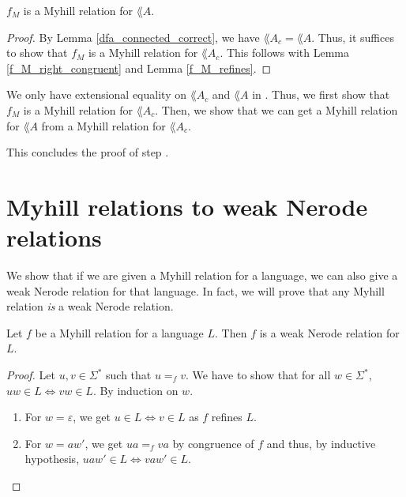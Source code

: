\begin{theorem}
    \label{dfa_to_myhill}
    $f_M$ is a Myhill relation for $\lang{A}$.
\end{theorem}
\begin{proof}
    By Lemma \ref{dfa_connected_correct}, we have $\lang{A_c} = \lang{A}$.
    Thus, it suffices to show that $f_M$ is a Myhill relation for $\lang{A_c}$.
    This follows with Lemma \ref{f_M_right_congruent} and Lemma \ref{f_M_refines}.
\end{proof}


We only have extensional equality on $\lang{A_c}$ and $\lang{A}$ in \coq.
Thus, we first show that $f_M$ is a Myhill relation for $\lang{A_c}$.
Then, we show that we can get a Myhill relation for $\lang{A}$ from a Myhill relation for $\lang{A_c}$.



This concludes the proof of step .

\section{Myhill relations to weak Nerode relations}
We show that if we are given a Myhill relation for a language, we can also give a weak Nerode relation for that language.
In fact, we will prove that any Myhill relation \textit{is} a weak Nerode relation.

\begin{theorem}
    \label{myhill_to_weak_nerode}
    Let $f$ be a Myhill relation for a language $L$.
    Then $f$ is a weak Nerode relation for $L$.
\end{theorem}
\begin{proof}
    Let $u, v \in \Sigma^*$ such that $u =_f v$. We have to show that for all $w \in \Sigma^*$, $u w \in L \Leftrightarrow v w \in L$.
    By induction on $w$.
    \begin{enumerate}
        \item For $w = \varepsilon$, we get $u \in L \Leftrightarrow v \in L$ as $f$ refines $L$.
        \item For $w = aw'$, we get $ua =_f va$ by congruence of $f$ and thus, by inductive hypothesis, $uaw' \in L \Leftrightarrow vaw' \in L$.
    \end{enumerate}
\end{proof}



